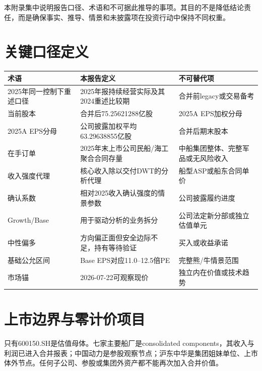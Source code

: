 本附录集中说明报告口径、术语和不可据此推导的事项。其目的不是降低结论责任，而是确保事实、推导、情景和未披露项在投资行动中保持不同权重。

\section{关键口径定义}

\begin{exhibitbox}[术语与采用口径]
\small
\begin{tabularx}{\exhibitboxwidth}{L{3.7cm}L{6.0cm}X}
\toprule
\textbf{术语} & \textbf{本报告定义} & \textbf{不可替代项} \\
\midrule
2025年同一控制下重述口径 & 2025年报持续经营实际及其2024重述比较期 & 合并前legacy或交易备考 \\
当前股本 & 合并后75.25621288亿股 & 2025A EPS加权分母 \\
2025A EPS分母 & 公司披露加权平均63.29638855亿股 & 合并后期末股本 \\
在手订单 & 2025年末上市公司民船/海工聚合合同存量 & 中船集团整体、完整军品或无风险收入 \\
收入强度代理 & 核心收入除以交付DWT的分析代理 & 船型ASP或船东合同单价 \\
确认系数 & 相对2025收入确认强度的情景参数 & 公司披露履约进度 \\
Growth/Base & 用于驱动分析的业务拆分 & 公司法定新分部或独立估值单元 \\
中性偏多 & 方向偏正面但安全边际不足，持有等待验证 & 买入或收益承诺 \\
基础公允区间 & Base EPS对应11.0--12.5倍PE & 完整熊/牛情景范围 \\
市场锚 & 2026-07-22可观察现价 & 独立内在价值或技术趋势 \\
\bottomrule
\end{tabularx}
\end{exhibitbox}

\section{上市边界与零计价项目}

只有600150.SH是估值母体。七家主要船厂是consolidated components，其收入与利润已进入合并报表；中国动力是参股观察节点；沪东中华是集团姐妹单位、上市体外节点。任何子公司、参股或集团外资产都不能再次加入合并价值。


